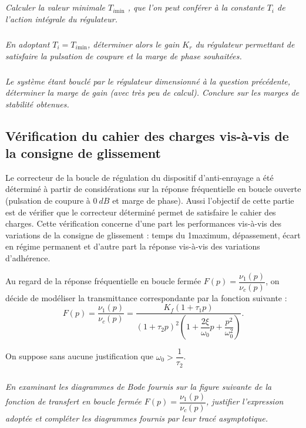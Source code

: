 \documentclass[10pt,fleqn]{article} %
\begin{document}
\begin{multicols}{2}
\subparagraph{}\textit{Calculer la valeur minimale $T_{i\text{min}}$ , que l’on peut conférer à la constante $T_i$ de l’action intégrale du régulateur.}


\subparagraph{}\textit{En adoptant $T_i=T_{i\text{min}}$, déterminer alors le gain $K_r$ du régulateur permettant de satisfaire la pulsation de coupure et la marge de phase souhaitées.
}


\subparagraph{}\textit{Le système étant bouclé par le régulateur dimensionné à la question
précédente, déterminer la marge de gain (avec très peu de calcul). Conclure sur les marges de stabilité obtenues.}

\subsection*{Vérification du cahier des charges vis-à-vis de la consigne de glissement}

Le correcteur de la boucle de régulation du dispositif d’anti-enrayage a été déterminé
à partir de considérations sur la réponse fréquentielle en boucle ouverte
(pulsation de coupure à  $\SI{0}{dB}$ et marge de phase). Aussi l’objectif de cette partie
est de vérifier que le correcteur déterminé permet de satisfaire le cahier des charges.
Cette vérification concerne d’une part les performances vis-à-vis des variations
de la consigne de glissement : temps du 1\ier maximum, dépassement, écart
en régime permanent et d’autre part la réponse vis-à-vis des variations d’adhérence.

Au regard de la réponse fréquentielle en boucle fermée $F(p)=\dfrac{\nu_1(p)}{\nu_c(p)}$, on décide de modéliser la transmittance correspondante par la fonction suivante : 
$$
F(p)=\dfrac{\nu_1(p)}{\nu_c(p)} = \dfrac{K_f\left(1+\tau_1 p\right)}{\left(1+\tau_2 p\right)^2 \left( 1+\dfrac{2\xi}{\omega_0}p + \dfrac{p^2}{\omega_0^2} \right)}.
$$

On suppose sans aucune justification que $\omega_0> \dfrac{1}{\tau_2}$. 

\subparagraph{}\textit{En examinant les diagrammes de Bode fournis sur la figure suivante de la fonction de
transfert en boucle fermée $F(p)=\dfrac{\nu_1(p)}{\nu_c(p)}$, justifier l’expression adoptée et
compléter les diagrammes fournis par leur tracé asymptotique.}


\end{multicols}
\end{document}
